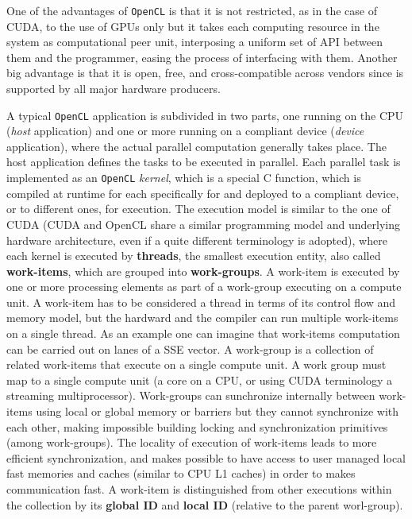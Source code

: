 \begin{description}
    One of the advantages of \texttt{OpenCL} is that it is not restricted, as in the case of CUDA\cite{NvidiaprogGuide}, to the use of GPUs only but it takes each computing resource in the system as computational peer unit, interposing a uniform set of API between them and the programmer, easing the process of interfacing with them. Another big advantage is that it is  open, free, and cross-compatible across vendors since is supported by all major hardware producers.
    
    A typical \texttt{OpenCL} application is subdivided in two parts, one
    running on the CPU (\textit{host} application) and one or more running on a
    compliant device (\textit{device} application), where the actual parallel
    computation generally takes place. The host application defines
    the tasks to be executed in parallel. Each parallel task is
    implemented as an \texttt{OpenCL} \emph{kernel}, which is a special C
    function, which is compiled at runtime for each specifically for and deployed to a compliant device, or to different ones, for execution. The execution model is similar to the one of CUDA (CUDA and OpenCL share a similar programming model and underlying hardware architecture, even if a quite different terminology is adopted), where each kernel is executed by \textbf{threads}, the smallest execution entity, also called \textbf{work-items}, which are grouped into \textbf{work-groups}. A work-item is executed by one or more processing elements as part of a work-group executing on a compute unit. A work-item has to be considered a thread in terms of its control flow and memory model, but the hardward and the compiler can run multiple work-items on a single thread. As an example one can imagine that work-items computation can be carried out on lanes of a SSE vector. 
    A work-group is a collection of related work-items that execute on a single compute unit. A work group must map to a single compute unit (a core on a CPU, or using CUDA terminology a streaming multiprocessor). 
    Work-groups can sunchronize internally between work-items using local or global memory or barriers but they cannot synchronize with each other, making impossible building locking and synchronization primitives (among work-groups).
    The  locality of execution of work-items  leads to more efficient synchronization, and makes possible to have access to user managed local fast memories and caches (similar to CPU L1 caches) in order to makes communication fast.    
    A work-item is distinguished from other executions within the collection by its \textbf{global ID} and \textbf{local ID} (relative to the parent worl-group).
    

\end{description}
